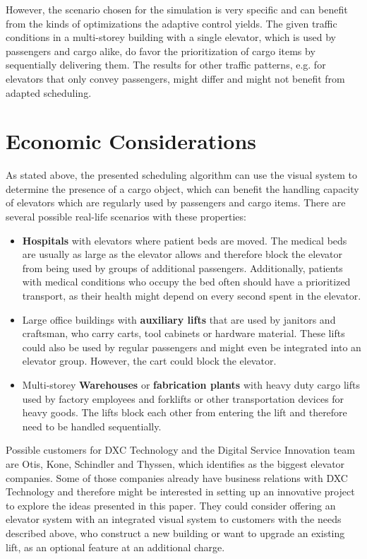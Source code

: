 However, the scenario chosen for the simulation is very specific and can benefit from the kinds of optimizations the adaptive control yields. 
The given traffic conditions in a multi-storey building with a single elevator, 
which is used by passengers and cargo alike, 
do favor the prioritization of cargo items by sequentially delivering them.
The results for other traffic patterns, e.g. for elevators that only convey passengers,
might differ and might not benefit from adapted scheduling.

\section{Economic Considerations}
As stated above, the presented scheduling algorithm can use the visual system to determine the presence of a cargo object, which can benefit the handling capacity of elevators which are regularly used by passengers and cargo items.
There are several possible real-life scenarios with these properties:
\begin{itemize}
    \item \textbf{Hospitals} with elevators where patient beds are moved. The medical beds are usually as large as the elevator allows and therefore block the elevator from being used by groups of additional passengers. Additionally, patients with medical conditions who occupy the bed often should have a prioritized transport, as their health might depend on every second spent in the elevator. 
    \item Large office buildings with \textbf{auxiliary lifts} that are used by janitors and craftsman, who carry carts, tool cabinets or hardware material. These lifts could also be used by regular passengers and might even be integrated into an elevator group. However, the cart could block the elevator.
    \item Multi-storey \textbf{Warehouses} or \textbf{fabrication plants} with heavy duty cargo lifts used 
    by factory employees and forklifts or other transportation devices for heavy goods. The lifts block each other from entering the lift and therefore need to be handled sequentially. 
\end{itemize}

Possible customers for DXC Technology and the Digital Service Innovation team are Otis, Kone, Schindler and Thyssen, which \textcite[][p.~4]{unger2015aufzuege} identifies as the biggest elevator companies. Some of those companies already have business relations with DXC Technology and therefore might be interested in setting up an innovative project to explore the ideas presented in this paper.
They could consider offering an elevator system with an integrated visual system to customers with the needs described above, who construct a new building or want to upgrade an existing lift, as an optional feature at an additional charge.

